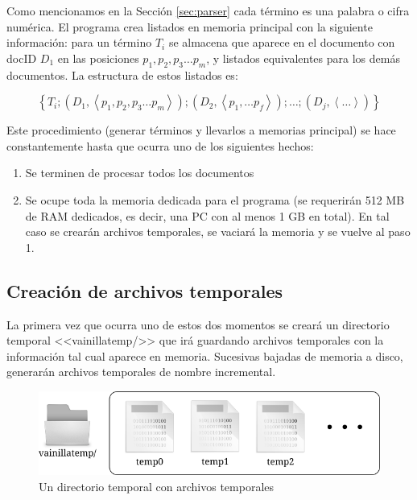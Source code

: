 Como mencionamos en la Sección \ref{sec:parser} cada término es una palabra o cifra numérica. El programa crea listados en memoria principal con la siguiente información: para un término $T_i$ se almacena que aparece en el documento con docID $D_1$ en las posiciones $p_1, p_2, p_3 \ldots p_m$, y listados equivalentes para los demás documentos. La estructura de estos listados es:

\[
\left\lbrace T_i ;
    \left( D_1 , 
        \left\langle
            p_1, p_2, p_3 \ldots p_m 
        \right\rangle  
    \right)
    ;
    \left( D_2 , 
        \left\langle
            p_1, \ldots p_f
        \right\rangle  
    \right) 
    ;
    \ldots
    ;
    \left( D_j , 
        \left\langle
            \dots
        \right\rangle  
    \right) 
\right\rbrace 
\]

Este procedimiento (generar términos y llevarlos a memorias principal) se hace constantemente hasta que ocurra uno de los siguientes hechos:

\begin{enumerate}
\item Se terminen de procesar todos los documentos
\item Se ocupe toda la memoria dedicada para el programa (se requerirán 512 MB de RAM dedicados, es decir, una PC con al menos 1 GB en total). En tal caso se crearán archivos temporales, se vaciará la memoria y se vuelve al paso 1.
\end{enumerate}


\subsection{Creación de archivos temporales}

La primera vez que ocurra uno de estos dos momentos se creará un directorio temporal <<vainillatemp/>> que irá guardando archivos temporales con la información tal cual aparece en memoria. Sucesivas bajadas de memoria a disco, generarán archivos temporales de nombre incremental.

\begin{figure}[!h]
\centering
    \includegraphics[scale=0.9]{./Images/tempDirEstr.png}
\caption{Un directorio temporal con archivos temporales}
\label{fig:tempdir}
\end{figure}


